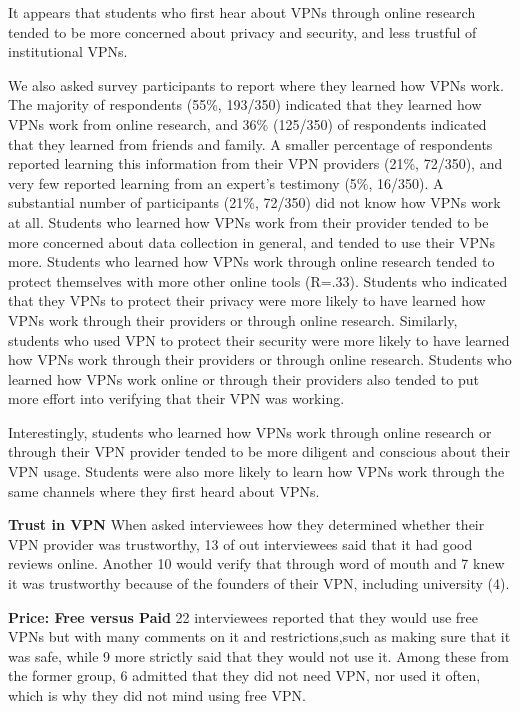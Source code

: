 It appears that students who first hear about VPNs through online research
tended to be more concerned about privacy and security, and less trustful of
institutional VPNs. 

We also asked survey participants to report where they learned how VPNs work.
The majority of respondents (55\%, 193/350) indicated that they learned how
VPNs work from online research, and 36\% (125/350) of respondents indicated
that they learned from friends and family. A smaller percentage of respondents
reported learning this information from their VPN providers (21\%, 72/350),
and very few reported learning from an expert’s testimony (5\%, 16/350). A
substantial number of participants (21\%, 72/350) did not know how VPNs work
at all.  Students who learned how VPNs work from their provider tended to be
more concerned about data collection in general, and tended to use their VPNs
more. Students who learned how VPNs work through online research tended to
protect themselves with more other online tools (R=.33). Students who
indicated that they VPNs to protect their privacy were more likely to have
learned how VPNs work through their providers or through online research.
Similarly, students who used VPN to protect their security were more likely to
have learned how VPNs work through their providers or through online research.
Students who learned how VPNs work online or through their providers also
tended to put more effort into verifying that their VPN was working.

Interestingly, students who learned how VPNs work through online research or
through their VPN provider tended to be more diligent and conscious about
their VPN usage. Students were also more likely to learn how VPNs work through
the same channels where they first heard about VPNs.

\textbf{Trust in VPN} When asked interviewees how they determined whether
their VPN provider was trustworthy, 13 of out interviewees said that it had
good reviews online. Another 10 would verify that through word of mouth and 7
knew it was trustworthy because of the founders of their VPN, including
university (4). 

\textbf{Price: Free versus Paid} 22 interviewees reported that they would use free VPNs but with
many comments on it and restrictions,such as making sure that it was safe,
while 9 more strictly said that they would not use it. Among these from the
former group, 6 admitted that they did not need VPN, nor used it often, which
is why they did not mind using free VPN. 

